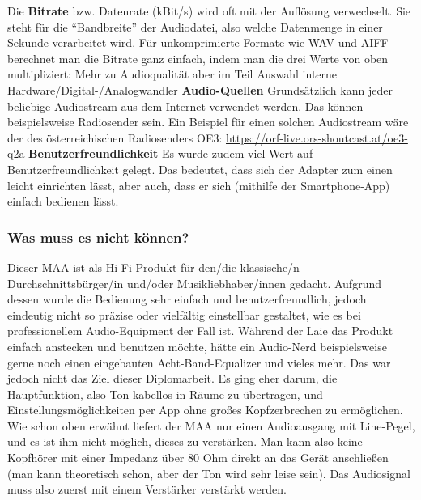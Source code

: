 \documentclass[11pt, twoside]{article}
\begin{document}
\glqq Die \textbf{Bitrate} bzw. Datenrate (kBit/s) wird oft mit der Auflösung verwechselt. Sie steht für die “Bandbreite” der Audiodatei, also welche Datenmenge in einer Sekunde verarbeitet wird. Für unkomprimierte Formate wie WAV und AIFF berechnet man die Bitrate ganz einfach, indem man die drei Werte von oben multipliziert:\grqq{}\newline
Mehr zu Audioqualität aber im Teil \glqq Auswahl interne Hardware/Digital-/Analogwandler\grqq{} \parencite{noauthor_urlnl04_nodate}
\vspace{4mm} \newline
\parencite[vgl.][]{noauthor_urlnl03_nodate}
\parencite[vgl.][]{noauthor_urlnl04_nodate}
\vspace{4mm}\newline
\textbf{Audio-Quellen}\newline
Grundsätzlich kann jeder beliebige Audiostream aus dem Internet verwendet werden. Das können beispielsweise Radiosender sein.
Ein Beispiel für einen solchen Audiostream wäre der des österreichischen Radiosenders \glqq OE3\grqq{}: \newline
\url{https://orf-live.ors-shoutcast.at/oe3-q2a}
\vspace{4mm}\newline
\textbf{Benutzerfreundlichkeit}\newline
Es wurde zudem viel Wert auf Benutzerfreundlichkeit gelegt. Das bedeutet, dass sich der Adapter zum einen leicht einrichten lässt, aber auch, dass er sich (mithilfe der Smartphone-App) einfach bedienen lässt.
\subsubsection{Was muss es nicht können?}
Dieser MAA ist als Hi-Fi-Produkt für den/die klassische/n Durchschnittsbürger/in und/oder Musikliebhaber/innen gedacht. Aufgrund dessen wurde die Bedienung sehr einfach und benutzerfreundlich, jedoch eindeutig nicht so präzise oder vielfältig einstellbar gestaltet, wie es bei professionellem Audio-Equipment der Fall ist. Während der Laie das Produkt einfach anstecken und benutzen möchte, hätte ein Audio-Nerd beispielsweise gerne noch einen eingebauten Acht-Band-Equalizer und vieles mehr. Das war jedoch nicht das Ziel dieser Diplomarbeit. Es ging eher darum, die Hauptfunktion, also Ton kabellos in Räume zu übertragen, und Einstellungsmöglichkeiten per App ohne großes Kopfzerbrechen zu ermöglichen.\newline
Wie schon oben erwähnt liefert der MAA nur einen Audioausgang mit Line-Pegel, und es ist ihm nicht möglich, dieses zu verstärken. Man kann also keine Kopfhörer mit einer Impedanz über 80 Ohm direkt an das Gerät anschließen (man kann theoretisch schon, aber der Ton wird sehr leise sein). Das Audiosignal muss also zuerst mit einem Verstärker verstärkt werden.\newline
\end{document}
